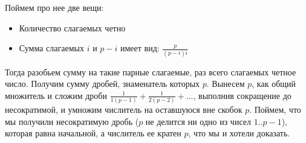 \documentclass{article}
\begin{document}
	Поймем про нее две вещи:
	\begin{itemize}
		\item Количество слагаемых четно
		
		\item Сумма слагаемых $i$ и $p - i$ имеет вид: $\frac{p}{(p - i)i}$
\end{itemize}	
	Тогда разобьем сумму на такие парные слагаемые, раз всего слагаемых четное число. Получим сумму дробей, знаменатель которых $p$. Вынесем $p$, как общий множитель и сложим дроби $\frac{1}{1(p - 1)} + \frac{1}{2(p - 2)} + ...  $, выполнив сокращение до несократимой, и умножим числитель на оставшуюся вне скобок $p$. Поймем, что мы получили несократимую дробь ($p$ не делится ни одно из чисел $1 .. p-1$), которая равна начальной, а числитель ее кратен $p$, что мы и хотели доказать.
	
	
\end{document}
